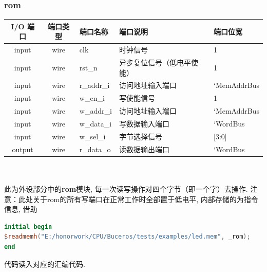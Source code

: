 \documentclass[lang=cn,11pt,a4paper,chinesefont=founder]{elegantpaper}
\begin{document}
\subsubsection{rom}
\begin{tabular}{cclll}
    \toprule
    I/O 端口 & 端口类型 & 端口名称   & 端口说明                   & 端口位宽    \\
    \midrule
    input    & wire     & clk        & 时钟信号                   & 1           \\
    input    & wire     & rst\_n     & 异步复位信号（低电平使能） & 1           \\

    input    & wire     & r\_addr\_i & 访问地址输入端口           & `MemAddrBus \\
    input    & wire     & w\_en\_i   & 写使能信号                 & 1           \\
    input    & wire     & w\_addr\_i & 访问地址输入端口           & `MemAddrBus \\
    input    & wire     & w\_data\_i & 写数据输入端口             & `WordBus    \\
    input    & wire     & w\_sel\_i  & 字节选择信号               & [3:0]       \\

    output   & wire     & r\_data\_o & 读数据输出端口             & `WordBus    \\
    \bottomrule
\end{tabular}\\
\\
此为外设部分中的\textbf{rom}模块, 每一次读写操作对四个字节（即一个字）去操作. 
注意：此处关于rom的所有写端口在正常工作时全部置于低电平, 内部存储的为指令信息,  借助
\begin{lstlisting}[language=verilog]
initial begin
$readmemh("E:/honorwork/CPU/Buceros/tests/examples/led.mem", _rom);
end
\end{lstlisting}
代码读入对应的汇编代码. 
\end{document}
